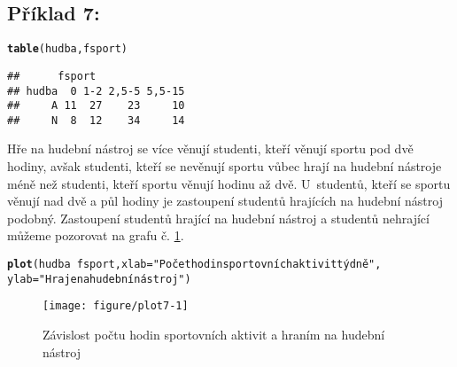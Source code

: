 \documentclass[twoside]{article}\usepackage[]{graphicx}\usepackage[]{color}
\makeatletter
\def\maxwidth{ %
  \ifdim\Gin@nat@width>\linewidth
    \linewidth
  \else
    \Gin@nat@width
  \fi
}
\newcommand{\hlstr}[1]{\textcolor[rgb]{0.192,0.494,0.8}{#1}}%
\newcommand{\hlopt}[1]{\textcolor[rgb]{0,0,0}{#1}}%
\newcommand{\hlstd}[1]{\textcolor[rgb]{0.345,0.345,0.345}{#1}}%
\newcommand{\hlkwc}[1]{\textcolor[rgb]{0.333,0.667,0.333}{#1}}%
\newcommand{\hlkwd}[1]{\textcolor[rgb]{0.737,0.353,0.396}{\textbf{#1}}}%
\newenvironment{kframe}{%
 \def\at@end@of@kframe{}%
 \ifinner\ifhmode%
  \def\at@end@of@kframe{\end{minipage}}%
  \begin{minipage}{\columnwidth}%
 \fi\fi%
 \def\FrameCommand##1{\hskip\@totalleftmargin \hskip-\fboxsep
 \colorbox{shadecolor}{##1}\hskip-\fboxsep
     \hskip-\linewidth \hskip-\@totalleftmargin \hskip\columnwidth}%
 \MakeFramed {\advance\hsize-\width
   \@totalleftmargin\z@ \linewidth\hsize
   \@setminipage}}%
 {\par\unskip\endMakeFramed%
 \at@end@of@kframe}
\newenvironment{knitrout}{}{} %
\makeatother
\begin{document}
\subsection*{Příklad 7:}
\begin{knitrout}
\color{fgcolor}\begin{kframe}
\begin{alltt}
\hlkwd{table}\hlstd{(hudba,fsport)}
\end{alltt}
\begin{verbatim}
##      fsport
## hudba  0 1-2 2,5-5 5,5-15
##     A 11  27    23     10
##     N  8  12    34     14
\end{verbatim}
\end{kframe}
\end{knitrout}

Hře na hudební nástroj se více věnují studenti, kteří věnují sportu pod dvě hodiny, avšak studenti, kteří se nevěnují sportu vůbec hrají na hudební nástroje méně než studenti, kteří sportu věnují hodinu až dvě. U~studentů, kteří se sportu věnují nad dvě a půl hodiny je zastoupení studentů hrajících na hudební nástroj podobný. Zastoupení studentů hrající na hudební nástroj a studentů nehrající můžeme pozorovat na grafu č. \ref{fig:plot7}.

\begin{knitrout}
\color{fgcolor}\begin{kframe}
\begin{alltt}
\hlkwd{plot}\hlstd{(hudba}\hlopt{~}\hlstd{fsport,} \hlkwc{xlab}\hlstd{=}\hlstr{"Počet hodin sportovních aktivit týdně"}\hlstd{,}
    \hlkwc{ylab}\hlstd{=}\hlstr{"Hraje na hudební nástroj"}\hlstd{)}
\end{alltt}
\end{kframe}\begin{figure}[h]
\texttt{[image: figure/plot7-1]} \caption[Závislost počtu hodin sportovních aktivit a hraním na hudební nástroj]{Závislost počtu hodin sportovních aktivit a hraním na hudební nástroj}\label{fig:plot7}
\end{figure}


\end{knitrout}
\end{document}
